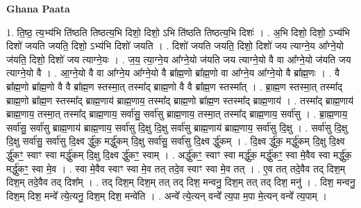 \documentclass[17pt]{extarticle}
\begin{document}
\textbf{Ghana Paata } \newline

1. ति॒ष्ठ॒ त्य॒भ्य॑भि ति॑ष्ठति तिष्ठत्य॒भि दिशो॒ दिशो॒ ऽभि ति॑ष्ठति तिष्ठत्य॒भि दिशः॑ । . अ॒भि दिशो॒ दिशो॒ ऽभ्य॑भि दिशो॑ जयति जयति॒ दिशो॒ ऽभ्य॑भि दिशो॑ जयति । . दिशो॑ जयति जयति॒ दिशो॒ दिशो॑ जय त्याग्ने॒य आ᳚ग्ने॒यो ज॑यति॒ दिशो॒ दिशो॑ जय त्याग्ने॒यः । . ज॒य॒ त्या॒ग्ने॒य आ᳚ग्ने॒यो ज॑यति जय त्याग्ने॒यो वै वा आ᳚ग्ने॒यो ज॑यति जय त्याग्ने॒यो वै । . आ॒ग्ने॒यो वै वा आ᳚ग्ने॒य आ᳚ग्ने॒यो वै ब्रा᳚ह्म॒णो ब्रा᳚ह्म॒णो वा आ᳚ग्ने॒य आ᳚ग्ने॒यो वै ब्रा᳚ह्म॒णः । . वै ब्रा᳚ह्म॒णो ब्रा᳚ह्म॒णो वै वै ब्रा᳚ह्म॒ण स्तस्मा॒त् तस्मा᳚द् ब्राह्म॒णो वै वै ब्रा᳚ह्म॒ण स्तस्मा᳚त् । . ब्रा॒ह्म॒ण स्तस्मा॒त् तस्मा᳚द् ब्राह्म॒णो ब्रा᳚ह्म॒ण स्तस्मा᳚द् ब्राह्म॒णाय॑ ब्राह्म॒णाय॒ तस्मा᳚द् ब्राह्म॒णो ब्रा᳚ह्म॒ण स्तस्मा᳚द् ब्राह्म॒णाय॑ । . तस्मा᳚द् ब्राह्म॒णाय॑ ब्राह्म॒णाय॒ तस्मा॒त् तस्मा᳚द् ब्राह्म॒णाय॒ सर्वा॑सु॒ सर्वा॑सु ब्राह्म॒णाय॒ तस्मा॒त् तस्मा᳚द् ब्राह्म॒णाय॒ सर्वा॑सु । . ब्रा॒ह्म॒णाय॒ सर्वा॑सु॒ सर्वा॑सु ब्राह्म॒णाय॑ ब्राह्म॒णाय॒ सर्वा॑सु दि॒क्षु दि॒क्षु सर्वा॑सु ब्राह्म॒णाय॑ ब्राह्म॒णाय॒ सर्वा॑सु दि॒क्षु । . सर्वा॑सु दि॒क्षु दि॒क्षु सर्वा॑सु॒ सर्वा॑सु दि॒क्ष्व र्द्धु॑क॒ मर्द्धु॑कम् दि॒क्षु सर्वा॑सु॒ सर्वा॑सु दि॒क्ष्व र्द्धु॑कम् । . दि॒क्ष्व र्द्धु॑क॒ मर्द्धु॑कम् दि॒क्षु दि॒क्ष्व र्द्धु॑कꣳ॒॒ स्वाꣳ स्वा मर्द्धु॑कम् दि॒क्षु दि॒क्ष्व र्द्धु॑कꣳ॒॒ स्वाम् । . अर्द्धु॑कꣳ॒॒ स्वाꣳ स्वा मर्द्धु॑क॒ मर्द्धु॑कꣳ॒॒ स्वा मे॒वैव स्वा मर्द्धु॑क॒ मर्द्धु॑कꣳ॒॒ स्वा मे॒व । . स्वा मे॒वैव स्वाꣳ स्वा मे॒व तत् तदे॒व स्वाꣳ स्वा मे॒व तत् । . ए॒व तत् तदे॒वैव तद् दिश॒म् दिश॒म् तदे॒वैव तद् दिश᳚म् । . तद् दिश॒म् दिश॒म् तत् तद् दिश॒ मन्वनु॒ दिश॒म् तत् तद् दिश॒ मनु॑ । . दिश॒ मन्वनु॒ दिश॒म् दिश॒ मन्वे᳚ त्ये॒त्यनु॒ दिश॒म् दिश॒ मन्वे॑ति । . अन्वे᳚ त्ये॒त्यन् वन्वे᳚ त्य॒पा म॒पा मे॒त्यन् वन्वे᳚ त्य॒पाम् । \newline
\end{document}

